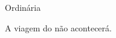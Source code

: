 \documentclass[11pt]{ifscata}
\begin{document}
\begin{reuniao}{Ordinária}
\begin{informes}
    \item A viagem do  não acontecerá.
\end{informes}

\begin{assuntos}
    \item 
    \aprovada

    \item
    \lipsum[2]
        
    \item
    \lipsum[4]

    \item
    \lipsum[4-5]
\end{assuntos}


\end{reuniao}

\end{document}
